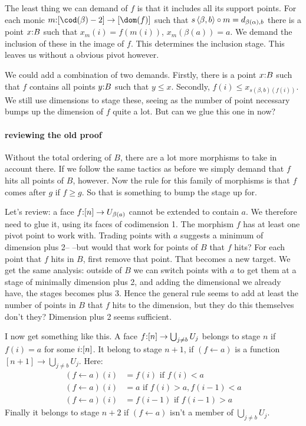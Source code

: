 \documentclass[csh.tex]{subfiles}
\begin{document}
The least thing we can demand of $f$ is that it includes all its support points. For each monic $m\of[\cod(\beta) - 2]\to [\dom(f)]$ such that $s\left\langle \beta,b \right\rangle\circ m = d_{\beta(\alpha), b}$ there is a point $x\mathord : B$ such that $x_m(i) = f(m(i))$, $x_m(\beta(a)) = a$. We demand the inclusion of these in the image of $f$. This determines the inclusion stage.
This leaves us without a obvious pivot however.

We could add a combination of two demands. Firstly, there is a point $x\mathord : B$ such that $f$ contains all points $y\mathord : B$ such that $y\leq x$.
Secondly, $f(i) \leq x_{s(\beta,b)(f(i))}$. We still use dimensions to stage these, seeing as the number of point necessary bumps up the dimension of $f$ quite a lot. But can we glue this one in now?
 
\paragraph{reviewing the old proof}
Without the total ordering of $B$, there are a lot more morphisms to take in account there. If we follow the same tactics as before we simply demand that $f$ hits all points of $B$, however.
Now the rule for this family of morphisms is that $f$ comes after $g$ if $f\geq g$. So that is something to bump the stage up for.

Let's review: a face $f\mathord : [n]\to U_{\beta(a)}$ cannot be extended to contain $a$. We therefore need to glue it, using its faces of codimension 1. The morphism $f$ has at least one pivot point to work with. Trading points with $a$ suggests a minimum of dimension plus 2-- --but would that work for points of $B$ that $f$ hits?
For each point that $f$ hits in $B$, first remove that point. That becomes a new target. We get the same analysis: outside of $B$ we can switch points with $a$ to get them at a stage of minimally dimension plus 2, and adding the dimensional we already have, the stages becomes plus 3. Hence the general rule seems to add at least the number of points in $B$ that $f$ hits to the dimension, but they do this themselves don't they? Dimension plus 2 seems sufficient.

I now get something like this. A face $f\mathord : [n] \to \bigcup_{j\neq b}U_j$ belongs to stage $n$ if $f(i) = a$ for some $i\mathord : [n]$. It belong to stage $n + 1$, if $(f \leftarrow a)$ is a function $[n + 1] \to \bigcup_{j\neq b}U_j$. Here:
\begin{align*}
(f \mathop\leftarrow a) (i) &= f(i) \textrm{ if } f(i) < a\\
(f \mathop\leftarrow a) (i) &= a \textrm{ if } f(i) > a, f(i - 1) < a \\
(f \mathop\leftarrow a) (i) &= f(i - 1) \textrm{ if } f(i - 1) > a
\end{align*}
Finally it belongs to stage $n + 2$ if $(f \leftarrow a)$ isn't a member of $\bigcup_{j\neq b}U_j$.
\end{document}
